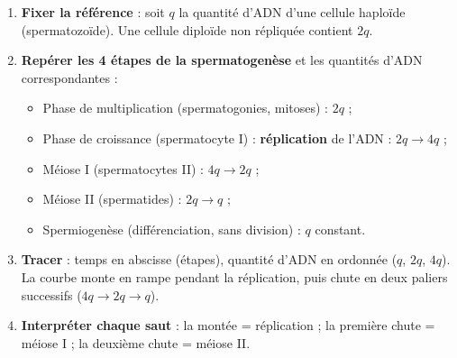 \documentclass[11pt]{article}
\begin{document}
\begin{methode}[Construire la courbe $Q_{\text{ADN}} = f(t)$]
\begin{enumerate}
\item \textbf{Fixer la référence} : soit $q$ la quantité d'ADN d'une cellule haploïde (spermatozoïde). Une cellule diploïde non répliquée contient $2q$.
\item \textbf{Repérer les 4 étapes de la spermatogenèse} et les quantités d'ADN correspondantes :
\begin{itemize}
\item Phase de multiplication (spermatogonies, mitoses) : $2q$ ;
\item Phase de croissance (spermatocyte I) : \textbf{réplication} de l'ADN : $2q \rightarrow 4q$ ;
\item Méiose I (spermatocytes II) : $4q \rightarrow 2q$ ;
\item Méiose II (spermatides) : $2q \rightarrow q$ ;
\item Spermiogenèse (différenciation, sans division) : $q$ constant.
\end{itemize}
\item \textbf{Tracer} : temps en abscisse (étapes), quantité d'ADN en ordonnée ($q$, $2q$, $4q$). La courbe monte en rampe pendant la réplication, puis chute en deux paliers successifs ($4q \rightarrow 2q \rightarrow q$).
\item \textbf{Interpréter chaque saut} : la montée = réplication ; la première chute = méiose I ; la deuxième chute = méiose II.
\end{enumerate}
\end{methode}
\end{document}
